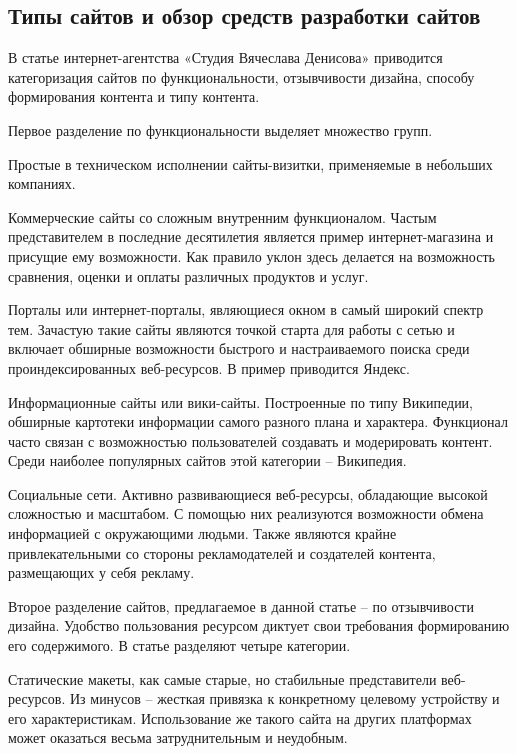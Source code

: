 \subsection{Типы сайтов и обзор средств разработки сайтов}

В статье интернет-агентства «Студия Вячеслава Денисова» \cite{denisov} приводится категоризация сайтов по функциональности, отзывчивости дизайна, способу формирования контента и типу контента.


Первое разделение по функциональности выделяет множество групп.

Простые в техническом исполнении сайты-визитки, применяемые в небольших компаниях.

Коммерческие сайты со сложным внутренним функционалом.
Частым представителем в последние десятилетия является пример интернет-магазина и присущие ему возможности.
Как правило уклон здесь делается на возможность сравнения, оценки и оплаты различных продуктов и услуг.

Порталы или интернет-порталы, являющиеся окном в самый широкий спектр тем.
Зачастую такие сайты являются точкой старта для работы с сетью и включает обширные возможности быстрого и настраиваемого поиска среди проиндексированных веб-ресурсов.
В пример приводится Яндекс.

Информационные сайты или вики-сайты.
Построенные по типу Википедии, обширные картотеки информации самого разного плана и характера.
Функционал часто связан с возможностью пользователей создавать и модерировать контент.
Среди наиболее популярных сайтов этой категории -- Википедия.

Социальные сети.
Активно развивающиеся веб-ресурсы, обладающие высокой сложностью и масштабом.
С помощью них реализуются возможности обмена информацией с окружающими людьми.
Также являются крайне привлекательными со стороны рекламодателей и создателей контента, размещающих у себя рекламу.


Второе разделение сайтов, предлагаемое в данной статье -- по отзывчивости дизайна.
Удобство пользования ресурсом диктует свои требования формированию его содержимого.
В статье разделяют четыре категории.

Статические макеты, как самые старые, но стабильные представители веб-ресурсов.
Из минусов -- жесткая привязка к конкретному целевому устройству и его характеристикам.
Использование же такого сайта на других платформах может оказаться весьма затруднительным и неудобным.

